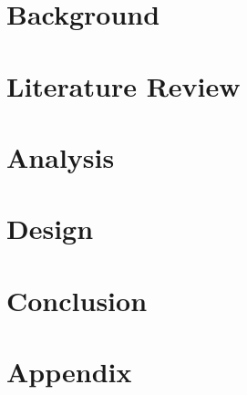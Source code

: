 \documentclass[12pt]{report}
\begin{document}
\chapter{Background}


\chapter{Literature Review}


\chapter{Analysis}

 
\chapter{Design}

 
\chapter{Conclusion}


% 

% 



\appendix
\chapter{Appendix}


\clearpage
{}
\printbibliography
\end{document}
